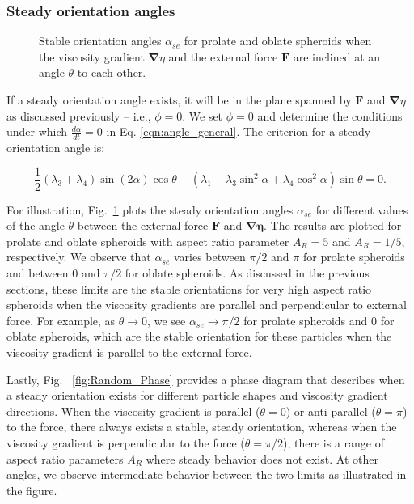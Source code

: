 \documentclass{jfm}
\begin{document}
\subsubsection{Steady orientation angles}

\begin{figure}
\centering
{}
\hfill
{}

\caption{Stable orientation angles $\alpha_{se}$ for prolate and oblate spheroids when the viscosity gradient $\boldsymbol{\nabla}\eta$ and the external force $\boldsymbol{F}$ are inclined at an angle $\theta$ to each other.}
\label{fig:Random_Equilibrium}
\end{figure}

If a steady orientation angle exists, it will be in the plane spanned by $\boldsymbol{F}$ and $\boldsymbol{\nabla} \eta$ as discussed previously – i.e., $\phi = 0$.  We set $\phi = 0$ and determine the conditions under which $\frac{d \alpha}{dt} = 0$ in Eq. \eqref{eqn:angle_general}.  The criterion for a steady orientation angle is:

\begin{equation}
\label{eq:evolution_net_random}
\frac{1}{2} \left(\lambda_3+\lambda_4\right) \sin(2\alpha)\cos{\theta}-\left(\lambda_1-\lambda_3\sin^2\alpha+\lambda_4\cos^2{\alpha}\right)\sin{\theta} = 0.
\end{equation}

For illustration, Fig.~\ref{fig:Random_Equilibrium} plots the steady orientation angles $\alpha_{se}$ for different values of the angle $\theta$ between the external force $\boldsymbol{F}$ and $\boldsymbol{\nabla}\mathbf{\eta}$.  The results are plotted for prolate and oblate spheroids with aspect ratio parameter $A_R = 5$ and $A_R = 1/5$, respectively.  We observe that $\alpha_{se}$ varies between $\pi/2$ and $\pi$ for prolate spheroids and between $0$ and $\pi/2$ for oblate spheroids. As discussed in the previous sections, these limits are the stable orientations for very high aspect ratio spheroids when the viscosity gradients are parallel and perpendicular to external force. For example, as $\theta \to 0$, we see $\alpha_{se} \rightarrow \pi/2$  for prolate spheroids and $0$ for oblate spheroids, which are the stable orientation for these particles when the viscosity gradient is parallel to the external force.

{Lastly, Fig. ~\ref{fig:Random_Phase} provides a phase diagram that describes when a steady orientation exists for different particle shapes and viscosity gradient directions}.   When the viscosity gradient is parallel ($\theta = 0$) or anti-parallel ($\theta = \pi$) to the force, there always exists a stable, steady orientation, whereas when the viscosity gradient is perpendicular to the force ($\theta = \pi/2$), there is a range of aspect ratio parameters $A_R$ where steady behavior does not exist.  At other angles, we observe intermediate behavior between the two limits as illustrated in the figure.
\end{document}
